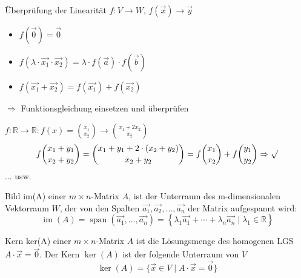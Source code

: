 \begin{KR}{Überprüfung der Linearität}
    $f: V \rightarrow W$, $f(\vec{x}) \rightarrow \vec{y}$
    \begin{itemize}
        \item $f(\vec{0}) = \vec{0}$
        \item $f(\lambda \cdot \overrightarrow{x_1} \cdot \vec{x_2}) = \lambda \cdot f(\overrightarrow{a}) \cdot f(\vec{b})$
        \item $f(\vec{x_1} + \vec{x_2}) = f(\vec{x_1}) + f(\vec{x_2})$
    \end{itemize}

    \vspace{1mm}

    $\Rightarrow$ Funktionsgleichung einsetzen und überprüfen
\end{KR}

\begin{example}
    $f: \mathbb{R} \rightarrow \mathbb{R}: f(x)=\binom{x_{1}}{x_{2}} \rightarrow\binom{x_{1}+2 x_{2}}{x_{2}}$
    $$
    f\binom{x_{1}+y_{1}}{x_{2}+y_{2}}=\binom{x_{1}+y_{1}+2 \cdot\left(x_{2}+y_{2}\right)}{x_{2}+y_{2}}
    =f\binom{x_{1}}{x_{2}}+f\binom{y_{1}}{y_{2}} \Rightarrow \surd 
    $$
    ... usw.
\end{example}


\begin{definition}{Bild im(A)}
    einer $m \times n$-Matrix $A$, ist der Unterraum des m-dimensionalen Vektorraum $W$, der von den Spalten $\overrightarrow{a_{1}}, \overrightarrow{a_{2}}, \ldots, \overrightarrow{a_{n}}$ der Matrix aufgespannt wird:
    $$
    \operatorname{im}(A)=\operatorname{span}\left(\overrightarrow{a_{1}}, \ldots, \overrightarrow{a_{n}}\right)=\left\{\lambda_{1} \overrightarrow{a_{1}}+\cdots+\lambda_{n} \overrightarrow{a_{n}} \mid \lambda_{1} \in \mathbb{R}\right\}
    $$
\end{definition}

\begin{definition}{Kern ker(A)}
    einer $m \times n$-Matrix $A$ ist die Lösungsmenge des homogenen LGS $A \cdot \vec{x}=\overrightarrow{0}$. Der Kern $\operatorname{ker}(A)$ ist der folgende Unterraum von $V$
    $$\operatorname{ker}(A)=\{\vec{x} \in V \mid A \cdot \vec{x}=\overrightarrow{0}\}$$
\end{definition}



